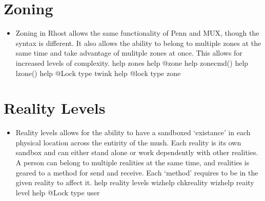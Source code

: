 \documentclass[letterpaper,10pt,english]{sphinxmanual}
\begin{document}
\section{Zoning}
\label{\detokenize{12-advanced:zoning}}\begin{itemize}
\item {} 
\sphinxAtStartPar
Zoning in Rhost allows the same functionality of Penn and MUX, though the
syntax is different.  It also allows the ability to belong to multiple
zones at the same time and take advantage of mulitple zones at once.
This allows for increased levels of complexity.
\sphinxhyphen{} help zones
\sphinxhyphen{} help @zone
\sphinxhyphen{} help zonecmd()
\sphinxhyphen{} help lzone()
\sphinxhyphen{} help @Lock type twink
\sphinxhyphen{} help @lock type zone

\end{itemize}


\section{Reality Levels}
\label{\detokenize{12-advanced:reality-levels}}\begin{itemize}
\item {} 
\sphinxAtStartPar
Reality levels allows for the ability to have a sandboxed ‘existance’
in each physical location across the entirity of the mush.  Each
reality is its own sandbox and can either stand alone or work
dependently with other realities.  A person can belong to multiple
realities at the same time, and realities is geared to a method for
send and receive.  Each ‘method’ requires to be in the given reality
to affect it.
\sphinxhyphen{} help reality levels
\sphinxhyphen{} wizhelp chkreality
\sphinxhyphen{} wizhelp reaity level
\sphinxhyphen{} help @Lock type user

\end{itemize}
\end{document}
